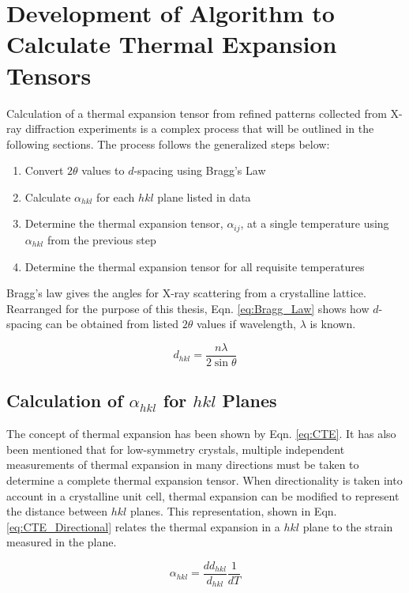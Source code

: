 \section{Development of Algorithm to Calculate Thermal Expansion Tensors}
Calculation of a thermal expansion tensor from refined patterns collected from X-ray diffraction experiments is a complex process that will be outlined in the following sections.  The process follows the generalized steps below:
\begin{enumerate}
 \item Convert $2\theta$ values to $d$-spacing using Bragg's Law
 \item Calculate $\alpha_{hkl}$ for each $hkl$ plane listed in data
 \item Determine the thermal expansion tensor, $\alpha_{ij}$, at a single temperature using $\alpha_{hkl}$ from the previous step
 \item Determine the thermal expansion tensor for all requisite temperatures
\end{enumerate}

Bragg's law gives the angles for X-ray scattering from a crystalline lattice.  Rearranged for the purpose of this thesis, Eqn. \ref{eq:Bragg_Law} shows how $d$-spacing can be obtained from listed $2\theta$ values if wavelength, $\lambda$ is known.

\begin{equation}
 d_{hkl} = \frac{n\lambda}{2\sin\theta}
 \label{eq:Bragg_Law}
\end{equation}

\subsection{Calculation of $\alpha_{hkl}$ for $hkl$ Planes}
The concept of thermal expansion has been shown by Eqn. \ref{eq:CTE}.  It has also been mentioned that for low-symmetry crystals, multiple independent measurements of thermal expansion in many directions must be taken to determine a complete thermal expansion tensor.  When directionality is taken into account in a crystalline unit cell, thermal expansion can be modified to represent the distance between $hkl$ planes.  This representation, shown in Eqn. \ref{eq:CTE_Directional} relates the thermal expansion in a $hkl$ plane to the strain measured in the plane.  

\begin{equation}
 \alpha_{hkl} = \frac{dd_{hkl}}{d_{hkl}} \frac{1}{dT}
 \label{eq:CTE_Directional}
\end{equation}

